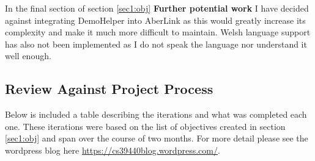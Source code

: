 In the final section of section \ref{sec1:obj} \textbf{Further potential work} I have decided against integrating DemoHelper into AberLink as this would greatly increase its complexity and make it much more difficult to maintain. Welsh language support has also not been implemented as I do not speak the language nor understand it well enough.

\subsection{Review Against Project Process}\label{sec3:pp}

Below is included a table describing the iterations and what was completed each one. These iterations were based on the list of objectives created in section \ref{sec1:obj} and span over the course of two months. For more detail please see the wordpress blog here \href{https://cs39440blog.wordpress.com/}{https://cs39440blog.wordpress.com/}.
\newpage
